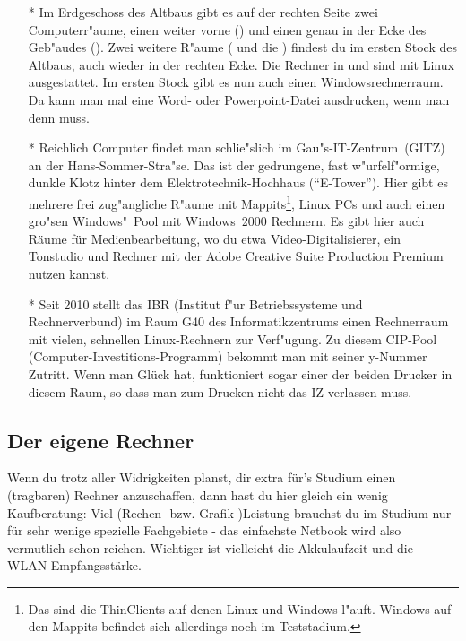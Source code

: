 \begin{itemize}

\item[*] Im Erdgeschoss des Altbaus gibt es auf der rechten Seite zwei
Computerr"aume, einen weiter vorne () und einen genau in der Ecke
des Geb"audes (). Zwei weitere R"aume ( und die
) findest du im ersten Stock des Altbaus, auch wieder in
der rechten Ecke. Die Rechner in  und  sind mit Linux
ausgestattet. Im ersten Stock gibt es nun auch einen Windowsrechnerraum. Da kann man mal eine Word- oder
Powerpoint-Datei ausdrucken, wenn man denn muss.

\item[*] Reichlich Computer findet man schlie"slich im Gau"s-IT-Zentrum~(GITZ) an der
Hans-Sommer-Stra"se. Das ist der gedrungene, fast w"urfelf"ormige, dunkle
Klotz hinter dem Elektrotechnik-Hochhaus ("`E-Tower"'). Hier gibt es mehrere frei
zug"angliche R"aume mit Mappits\footnote{Das sind die ThinClients auf denen
Linux und Windows l"auft. Windows auf den Mappits befindet sich allerdings noch
im Teststadium.}, Linux PCs und auch einen gro"sen Windows"~Pool mit
Windows~2000 Rechnern. Es gibt hier auch Räume für Medienbearbeitung, wo du etwa
Video-Digitalisierer, ein Tonstudio und Rechner mit der Adobe Creative Suite 
Production Premium nutzen kannst.

\item[*] Seit 2010 stellt das IBR (Institut f"ur Betriebssysteme und Rechnerverbund)
im Raum G40 des Informatikzentrums einen Rechnerraum mit vielen, schnellen Linux-Rechnern 
zur Verf"ugung. Zu diesem CIP-Pool (Computer-Investitions-Programm) bekommt man mit 
seiner y-Nummer Zutritt. Wenn man Glück hat, funktioniert sogar einer der beiden Drucker
in diesem Raum, so dass man zum Drucken nicht das IZ verlassen muss.

\end{itemize}


\subsection{Der eigene Rechner}
Wenn du trotz aller Widrigkeiten planst, dir extra für's Studium einen 
(tragbaren) Rechner anzuschaffen, dann hast du hier gleich ein wenig 
Kaufberatung: Viel (Rechen- bzw. Grafik-)Leistung brauchst du im Studium 
nur für sehr wenige spezielle Fachgebiete - das einfachste Netbook wird also 
vermutlich schon reichen. Wichtiger ist vielleicht die Akkulaufzeit und die WLAN-Empfangsstärke.


